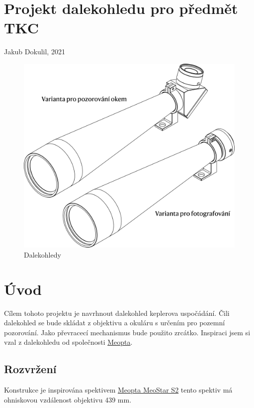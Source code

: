 \documentclass[
]{article}
\author{Jakub Dokulil}
\date{2021}
\begin{document}
\hypertarget{projekt-dalekohledu-pro-pux159edmux11bt-tkc}{%
\section{Projekt dalekohledu pro předmět
TKC}\label{projekt-dalekohledu-pro-pux159edmux11bt-tkc}}

Jakub Dokulil, 2021

\begin{figure}
\centering
\includegraphics{imgs/dalekohledy_1.png}
\caption{Dalekohledy}
\end{figure}

\section*{Úvod}
Cílem tohoto projektu je navrhnout dalekohled keplerova uspočádání. Čili dalekohled se bude skládat z objektivu a okuláru s určením pro pozemní pozorování. Jako převracecí mechanismus bude použito zrcátko. Inspiraci jsem si vzal z dalekohledu od společnosti \href{https://eshop.meopta.cz/spektivy/}{Meopta}.

\hypertarget{rozvrux17eenuxed}{%
\subsection{Rozvržení}\label{rozvrux17eenuxed}}

Konstrukce je inspirována spektivem
\href{https://eshop.meopta.cz/spektivy-meostar-s2/spektiv-meostar-s2-82-hd-sikmy/}{Meopta
MeoStar S2} tento spektiv má ohniskovou vzdálenost objektivu 439 mm.
\end{document}
